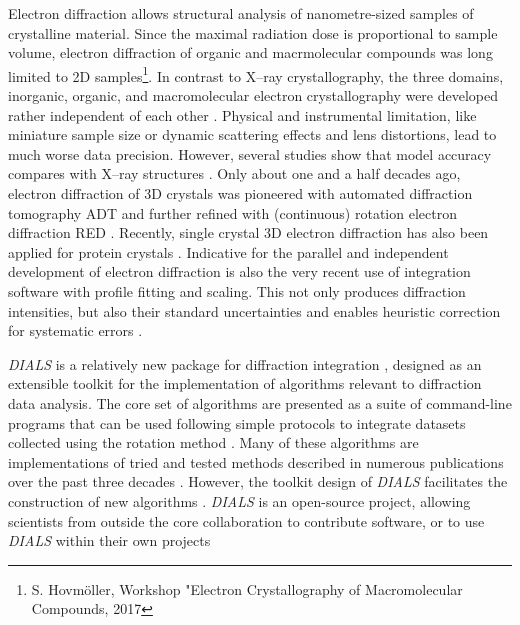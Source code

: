 \documentclass[preprint]{iucr}
\newcommand{\dials}{\emph{DIALS}\xspace}
\newcounter{DWCounter}
\newcommand{\DW}[1]{%
   \stepcounter{DWCounter}%
   {\color{red}{\textbf{DW \#\arabic{DWCounter}: }#1}}%
  }
\begin{document}
Electron diffraction allows structural analysis of nanometre-sized samples of
crystalline material. Since the maximal radiation dose is proportional to sample
volume, electron diffraction of organic and macrmolecular compounds was long
limited to 2D samples\footnote{S. Hovm{\"o}ller, Workshop "Electron
Crystallography of Macromolecular Compounds, 2017}\cite{unwin-henderson:1975}.
In contrast to X--ray crystallography,  the three domains, inorganic, organic,
and macromolecular electron crystallography were developed rather independent of
each other
\cite{vainshtein:1964,dorset:1995,glaeser_downing_derosier:2007,zou:2011}.
Physical and instrumental limitation, like miniature sample size or dynamic
scattering effects and lens distortions, lead to much worse data precision.
However, several studies show that model accuracy compares with X--ray
structures \cite{weirich:1996,zeo_adt:2014,dorset:1992,palatinus:2017}. Only
about one and a half decades ago, electron diffraction of 3D crystals was
pioneered with automated diffraction tomography ADT and further refined with
(continuous) rotation electron diffraction RED
\cite{adt:2007,rotmethod_e:2010}. Recently, single crystal 3D electron
diffraction has also been applied for protein crystals
\cite{microed_method:2015}. Indicative for the parallel and independent
development of electron diffraction is also the very recent use of integration
software with profile fitting and scaling. This not only produces diffraction
intensities, but also their standard uncertainties and enables heuristic
correction for systematic errors \cite{pflugrath:1999,leslie1999integration}.

\dials is a relatively new package for diffraction integration
\cite{Winter2017}, designed as an extensible toolkit for the implementation of
algorithms relevant to diffraction data analysis. The core set of algorithms
are presented as a suite of command-line programs that can be used following
simple protocols to integrate datasets collected using the rotation method
\cite{Arndt1977}. Many of these algorithms are implementations of tried and
tested methods described in numerous publications over the past three decades
\cite{leslie1999integration,LURE1986phase1and2,LURE1986phase3,kabsch2010xds}.
However, the toolkit design of \dials facilitates the construction of new
algorithms \cite{Gildea2014,Parkhurst2016,Parkhurst2017}. \dials is an
open-source project, allowing scientists from outside the core collaboration to
contribute software, or to use \dials within their own projects \DW{REF
cctbx.xfel, IOTA, any others?}
\end{document}
